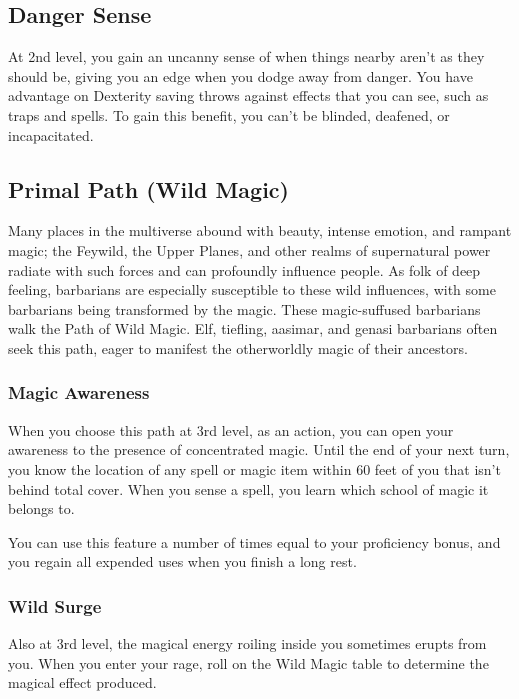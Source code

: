{\subsection*{Danger Sense}
At 2nd level, you gain an uncanny sense of when things nearby aren't as they should be, giving you an edge when you dodge away from danger. You have advantage on Dexterity saving throws against effects that you can see, such as traps and spells. To gain this benefit, you can't be blinded, deafened, or incapacitated.
\subsection*{Primal Path (Wild Magic)}
Many places in the multiverse abound with beauty, intense emotion, and rampant magic; the Feywild, the Upper Planes, and other realms of supernatural power radiate with such forces and can profoundly influence people. As folk of deep feeling, barbarians are especially susceptible to these wild influences, with some barbarians being transformed by the magic. These magic-suffused barbarians walk the Path of Wild Magic. Elf, tiefling, aasimar, and genasi barbarians often seek this path, eager to manifest the otherworldly magic of their ancestors.
\subsubsection*{Magic Awareness}
When you choose this path at 3rd level, as an action, you can open your awareness to the presence of concentrated magic. Until the end of your next turn, you know the location of any spell or magic item within 60 feet of you that isn't behind total cover. When you sense a spell, you learn which school of magic it belongs to.

You can use this feature a number of times equal to your proficiency bonus, and you regain all expended uses when you finish a long rest.
\subsubsection*{Wild Surge}
Also at 3rd level, the magical energy roiling inside you sometimes erupts from you. When you enter your rage, roll on the Wild Magic table to determine the magical effect produced.

}
